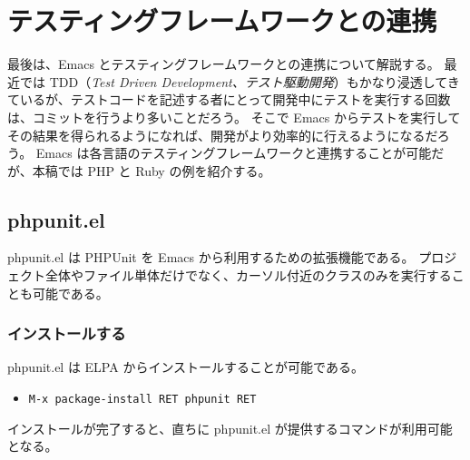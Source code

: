 \section{テスティングフレームワークとの連携}
最後は、Emacs とテスティングフレームワークとの連携について解説する。
最近では TDD（\emph{Test Driven Development、テスト駆動開発}）もかなり浸透してきているが、テストコードを記述する者にとって開発中にテストを実行する回数は、コミットを行うより多いことだろう。
そこで Emacs からテストを実行してその結果を得られるようになれば、開発がより効率的に行えるようになるだろう。
Emacs は各言語のテスティングフレームワークと連携することが可能だが、本稿では PHP と Ruby の例を紹介する。
\subsection{phpunit.el}
phpunit.el は PHPUnit を Emacs から利用するための拡張機能である。
プロジェクト全体やファイル単体だけでなく、カーソル付近のクラスのみを実行することも可能である。
\subsubsection{インストールする}
phpunit.el は ELPA からインストールすることが可能である。
\begin{itemize}\setlength{\leftskip}{-1.00zw}%
\item[] \texttt{M-x package-install RET phpunit RET}
\end{itemize}
インストールが完了すると、直ちに phpunit.el が提供するコマンドが利用可能となる。
